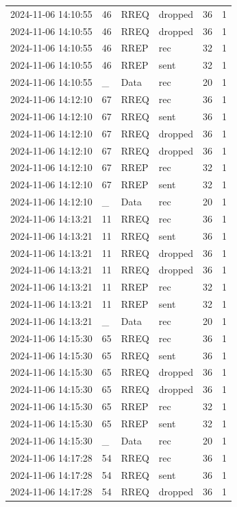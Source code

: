 \documentclass[]{nsm-thesis}
\begin{document}
\begin{longtable}{llllll}
2024-11-06 14:10:55 & 46 & RREQ & dropped & 36 & 1 \\
2024-11-06 14:10:55 & 46 & RREQ & dropped & 36 & 1 \\
2024-11-06 14:10:55 & 46 & RREP & rec & 32 & 1 \\
2024-11-06 14:10:55 & 46 & RREP & sent & 32 & 1 \\
2024-11-06 14:10:55 & _ & Data & rec & 20 & 1 \\
2024-11-06 14:12:10 & 67 & RREQ & rec & 36 & 1 \\
2024-11-06 14:12:10 & 67 & RREQ & sent & 36 & 1 \\
2024-11-06 14:12:10 & 67 & RREQ & dropped & 36 & 1 \\
2024-11-06 14:12:10 & 67 & RREQ & dropped & 36 & 1 \\
2024-11-06 14:12:10 & 67 & RREP & rec & 32 & 1 \\
2024-11-06 14:12:10 & 67 & RREP & sent & 32 & 1 \\
2024-11-06 14:12:10 & _ & Data & rec & 20 & 1 \\
2024-11-06 14:13:21 & 11 & RREQ & rec & 36 & 1 \\
2024-11-06 14:13:21 & 11 & RREQ & sent & 36 & 1 \\
2024-11-06 14:13:21 & 11 & RREQ & dropped & 36 & 1 \\
2024-11-06 14:13:21 & 11 & RREQ & dropped & 36 & 1 \\
2024-11-06 14:13:21 & 11 & RREP & rec & 32 & 1 \\
2024-11-06 14:13:21 & 11 & RREP & sent & 32 & 1 \\
2024-11-06 14:13:21 & _ & Data & rec & 20 & 1 \\
2024-11-06 14:15:30 & 65 & RREQ & rec & 36 & 1 \\
2024-11-06 14:15:30 & 65 & RREQ & sent & 36 & 1 \\
2024-11-06 14:15:30 & 65 & RREQ & dropped & 36 & 1 \\
2024-11-06 14:15:30 & 65 & RREQ & dropped & 36 & 1 \\
2024-11-06 14:15:30 & 65 & RREP & rec & 32 & 1 \\
2024-11-06 14:15:30 & 65 & RREP & sent & 32 & 1 \\
2024-11-06 14:15:30 & _ & Data & rec & 20 & 1 \\
2024-11-06 14:17:28 & 54 & RREQ & rec & 36 & 1 \\
2024-11-06 14:17:28 & 54 & RREQ & sent & 36 & 1 \\
2024-11-06 14:17:28 & 54 & RREQ & dropped & 36 & 1 \\

\end{longtable}
\end{document}
